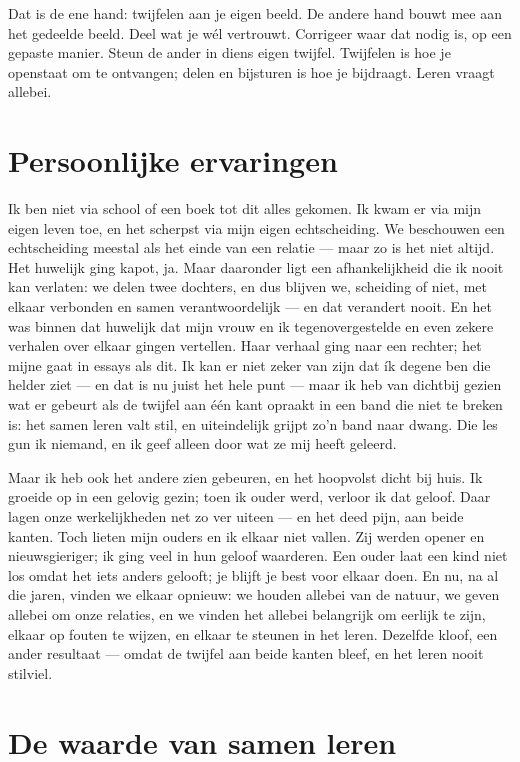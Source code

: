 \documentclass{article}
\begin{document}
Dat is de ene hand: twijfelen aan je eigen beeld. De andere hand bouwt mee aan het gedeelde beeld. Deel wat je wél vertrouwt. Corrigeer waar dat nodig is, op een gepaste manier. Steun de ander in diens eigen twijfel. Twijfelen is hoe je openstaat om te ontvangen; delen en bijsturen is hoe je bijdraagt. Leren vraagt allebei.

\section*{Persoonlijke ervaringen}

Ik ben niet via school of een boek tot dit alles gekomen. Ik kwam er via mijn eigen leven toe, en het scherpst via mijn eigen echtscheiding. We beschouwen een echtscheiding meestal als het einde van een relatie --- maar zo is het niet altijd. Het huwelijk ging kapot, ja. Maar daaronder ligt een afhankelijkheid die ik nooit kan verlaten: we delen twee dochters, en dus blijven we, scheiding of niet, met elkaar verbonden en samen verantwoordelijk --- en dat verandert nooit. En het was binnen dat huwelijk dat mijn vrouw en ik tegenovergestelde en even zekere verhalen over elkaar gingen vertellen. Haar verhaal ging naar een rechter; het mijne gaat in essays als dit. Ik kan er niet zeker van zijn dat ík degene ben die helder ziet --- en dat is nu juist het hele punt --- maar ik heb van dichtbij gezien wat er gebeurt als de twijfel aan één kant opraakt in een band die niet te breken is: het samen leren valt stil, en uiteindelijk grijpt zo'n band naar dwang. Die les gun ik niemand, en ik geef alleen door wat ze mij heeft geleerd.

Maar ik heb ook het andere zien gebeuren, en het hoopvolst dicht bij huis. Ik groeide op in een gelovig gezin; toen ik ouder werd, verloor ik dat geloof. Daar lagen onze werkelijkheden net zo ver uiteen --- en het deed pijn, aan beide kanten. Toch lieten mijn ouders en ik elkaar niet vallen. Zij werden opener en nieuwsgieriger; ik ging veel in hun geloof waarderen. Een ouder laat een kind niet los omdat het iets anders gelooft; je blijft je best voor elkaar doen. En nu, na al die jaren, vinden we elkaar opnieuw: we houden allebei van de natuur, we geven allebei om onze relaties, en we vinden het allebei belangrijk om eerlijk te zijn, elkaar op fouten te wijzen, en elkaar te steunen in het leren. Dezelfde kloof, een ander resultaat --- omdat de twijfel aan beide kanten bleef, en het leren nooit stilviel.

\section*{De waarde van samen leren}
\end{document}
